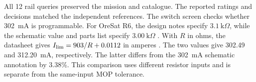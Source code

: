 All 12 rail queries preserved the mission and catalogue. The reported ratings and decisions matched the independent references. The switch screen checks whether 302~mA is programmable. For OreSat R6, the design notes specify $3.1~\mathrm{k}\Omega$, while the schematic value and parts list specify $3.00~\mathrm{k}\Omega$ \citep{oresatc3v5hardware}. With $R$ in ohms, the datasheet gives $I_{\rm lim}=903/R+0.0112$ in amperes \citep[Eq.~5]{cots-mission_ti_tps259620ddat_ds}. The two values give 302.49 and 312.20~mA, respectively. The latter differs from the 302~mA schematic annotation by 3.38\%. This comparison uses different resistor inputs and is separate from the same-input MOP tolerance.
